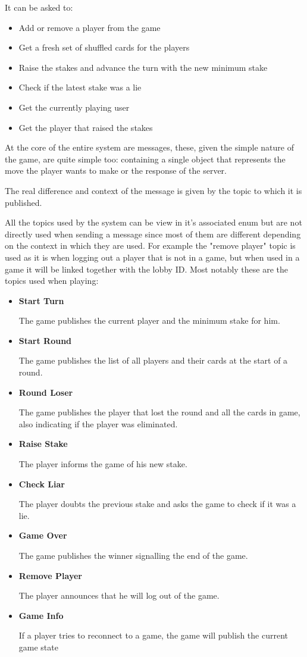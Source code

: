 \documentclass{scrartcl}
\begin{document}
It can be asked to:
\begin{itemize}
      \item Add or remove a player from the game
      \item Get a fresh set of shuffled cards for the players
      \item Raise the stakes and advance the turn with the new minimum stake
      \item Check if the latest stake was a lie
      \item Get the currently playing user
      \item Get the player that raised the stakes
\end{itemize}

At the core of the entire system are messages, these, given the simple nature of the game,
are quite simple too: containing a single object that represents the move the player wants to make or
the response of the server.

The real difference and context of the message is given by the topic to which it is published.

All the topics used by the system can be view in it's associated enum but are not directly
used when sending a message since most of them are different depending on the context in which they are used.
For example the "remove player" topic is used as it is when logging out a player that is not
in a game, but when used in a game it will be linked together with the lobby ID.
Most notably these are the topics used when playing:
\begin{itemize}
      \item \textbf{Start Turn} \par
            The game publishes the current player and the minimum stake for him.
      \item \textbf{Start Round} \par
            The game publishes the list of all players and their cards at the start of a round.
      \item \textbf{Round Loser} \par
            The game publishes the player that lost the round and all the cards in game,
            also indicating if the player was eliminated.
      \item \textbf{Raise Stake} \par
            The player informs the game of his new stake.
      \item \textbf{Check Liar} \par
            The player doubts the previous stake and asks the game to check if it was a lie.
      \item \textbf{Game Over} \par
            The game publishes the winner signalling the end of the game.
      \item \textbf{Remove Player} \par
            The player announces that he will log out of the game.
      \item \textbf{Game Info} \par
            If a player tries to reconnect to a game, the game will publish the current game state
\end{itemize}
\end{document}
